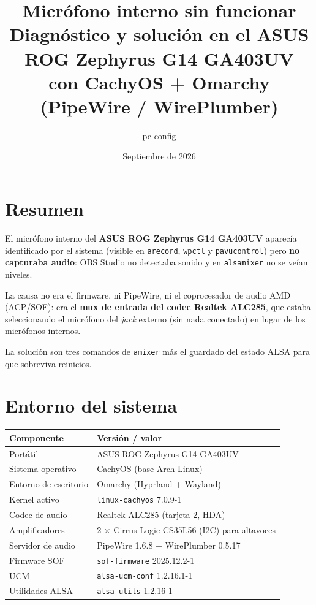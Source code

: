 \documentclass[12pt,a4paper]{article}
\title{%
  \textbf{Micrófono interno sin funcionar}\\[0.4em]
  \large Diagnóstico y solución en el ASUS ROG Zephyrus G14 GA403UV\\
  con CachyOS + Omarchy (PipeWire / WirePlumber)
}
\author{pc-config}
\date{Septiembre de 2026}
\begin{document}
\maketitle
\tableofcontents
\newpage

\section{Resumen}

El micrófono interno del \textbf{ASUS ROG Zephyrus G14 GA403UV} aparecía
identificado por el sistema (visible en \texttt{arecord}, \texttt{wpctl} y
\texttt{pavucontrol}) pero \textbf{no capturaba audio}: OBS Studio no detectaba
sonido y en \texttt{alsamixer} no se veían niveles.

La causa no era el firmware, ni PipeWire, ni el coprocesador de audio AMD
(ACP/SOF): era el \textbf{mux de entrada del codec Realtek ALC285}, que estaba
seleccionando el micrófono del \emph{jack} externo (sin nada conectado) en
lugar de los micrófonos internos.

La solución son tres comandos de \texttt{amixer} más el guardado del estado
ALSA para que sobreviva reinicios.

\section{Entorno del sistema}

\begin{center}
\begin{tabular}{ll}
  \toprule
  Componente & Versión / valor \\
  \midrule
  Portátil            & ASUS ROG Zephyrus G14 GA403UV \\
  Sistema operativo   & CachyOS (base Arch Linux) \\
  Entorno de escritorio & Omarchy (Hyprland + Wayland) \\
  Kernel activo       & \texttt{linux-cachyos} 7.0.9-1 \\
  Codec de audio      & Realtek ALC285 (tarjeta 2, HDA) \\
  Amplificadores      & 2 × Cirrus Logic CS35L56 (I2C) para altavoces \\
  Servidor de audio   & PipeWire 1.6.8 + WirePlumber 0.5.17 \\
  Firmware SOF        & \texttt{sof-firmware} 2025.12.2-1 \\
  UCM                 & \texttt{alsa-ucm-conf} 1.2.16.1-1 \\
  Utilidades ALSA     & \texttt{alsa-utils} 1.2.16-1 \\
  \bottomrule
\end{tabular}
\end{center}
\end{document}

